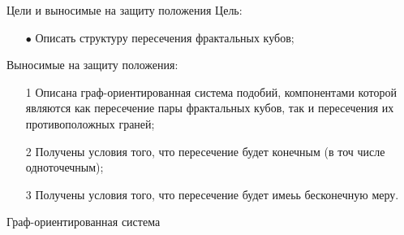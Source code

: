 \documentclass[aspectratio=1610, 10pt, notheorems]{beamer}
\newtheorem{definition}  {Определение}
\begin{document}
\begin{frame}{Цели и выносимые на защиту положения}
Цель:
\begin{enumerate}
\item[$\bullet$] Описать структуру пересечения фрактальных кубов;
\end{enumerate}

\hfill

Выносимые на защиту положения:
\begin{enumerate}
\item[1] Описана граф-ориентированная система подобий, компонентами которой являются как пересечение пары фрактальных кубов, так и пересечения их противоположных граней;
\item[2] Получены условия того, что пересечение будет конечным (в точ числе одноточечным);
\item[3] Получены условия того, что пересечение будет имеьь бесконечную меру.
\end{enumerate}
\end{frame}


\begin{frame}{Граф-ориентированная система}
\end{frame}
\end{document}
